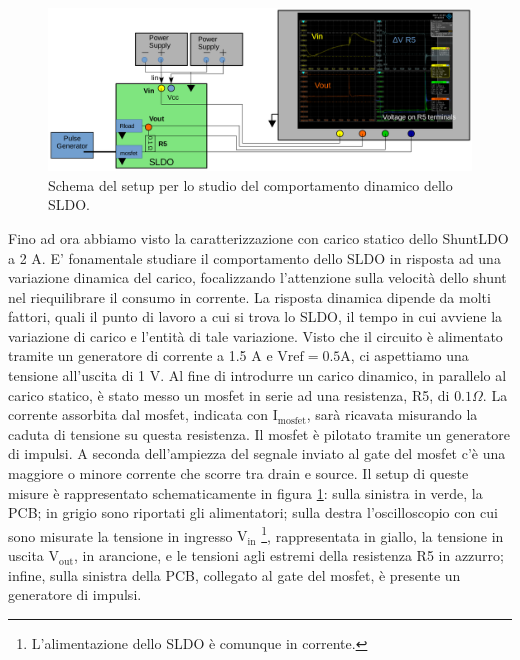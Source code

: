 \begin{figure}[!htb]
\centering
\includegraphics[scale=.3]{Immagini/SetupScheme}
\caption{Schema del setup per lo studio del comportamento dinamico dello SLDO.}
\label{Setupscheme}
\end{figure}

Fino ad ora abbiamo visto la caratterizzazione con carico statico dello ShuntLDO a 2 A.
E' fonamentale studiare il comportamento dello SLDO in risposta ad una variazione dinamica del carico, focalizzando l'attenzione sulla velocità dello shunt nel riequilibrare il consumo in corrente. 
La risposta dinamica dipende da molti fattori, quali il punto di lavoro a cui si trova lo SLDO, il tempo in cui avviene la variazione di carico e l'entità di tale variazione. 
Visto che il circuito è alimentato tramite un generatore di corrente a 1.5 A e $\mathrm{Vref=0.5 A}$, ci aspettiamo una tensione all'uscita di 1 V.
Al fine di introdurre un carico dinamico, in parallelo al carico statico, è stato messo un mosfet in serie ad una resistenza, R5, di $0.1 \Omega$.
La corrente assorbita dal mosfet, indicata con $\mathrm{I_{mosfet}}$, sarà ricavata misurando la caduta di tensione su questa resistenza.
Il mosfet è pilotato tramite un generatore di impulsi.
A seconda dell'ampiezza del segnale inviato al gate del mosfet c'è una maggiore o minore corrente che scorre tra drain e source. 
Il setup di queste misure è rappresentato schematicamente in figura \ref{Setupscheme}: sulla sinistra in verde, la PCB; in grigio sono riportati gli alimentatori; sulla destra l'oscilloscopio con cui sono misurate la tensione in ingresso $\mathrm{V_{in}}$
\footnote{
L'alimentazione dello SLDO è comunque in corrente.
}, rappresentata in giallo, la tensione in uscita $\mathrm{V_{out}}$, in arancione, e le tensioni agli estremi della resistenza R5 in azzurro; infine, sulla sinistra della PCB, collegato al gate del mosfet, è presente un generatore di impulsi. 
